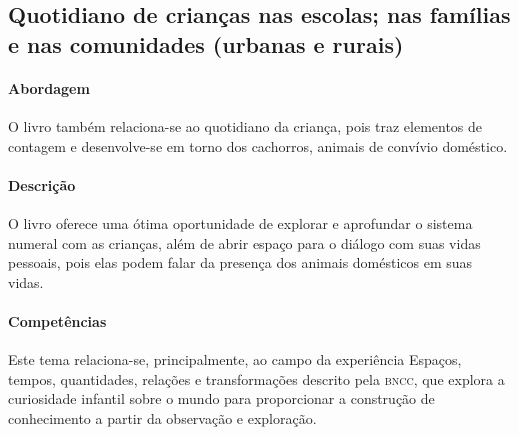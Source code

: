 \documentclass[11pt]{extarticle}
\begin{document}
\subsection{Quotidiano de crianças nas escolas; nas famílias e nas comunidades (urbanas e rurais)}

\paragraph{Abordagem} O livro também relaciona-se ao quotidiano da criança, pois traz elementos de contagem e desenvolve-se em torno dos cachorros, animais de convívio doméstico.


\paragraph{Descrição} O livro oferece uma ótima oportunidade de explorar 
e aprofundar o sistema numeral com as crianças, além de abrir espaço para o diálogo com suas vidas pessoais, pois elas podem falar da presença dos animais domésticos em suas vidas.

\paragraph{Competências} Este tema relaciona-se, principalmente, ao 
campo da experiência Espaços, tempos, quantidades, relações e transformações 
descrito pela \textsc{bncc}, que explora a curiosidade infantil sobre o mundo 
para proporcionar a construção de conhecimento a partir da observação e exploração.
\end{document}
